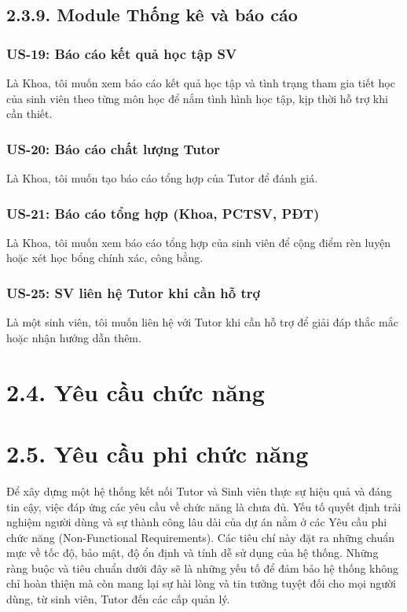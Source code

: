 
\subsection*{2.3.9. Module Thống kê và báo cáo}
\subsubsection*{US-19: Báo cáo kết quả học tập SV} 
Là Khoa, tôi muốn xem báo cáo kết quả học tập và tình trạng tham gia tiết học của sinh viên theo từng môn học để nắm tình hình học tập, kịp thời hỗ trợ khi cần thiết.

\subsubsection*{US-20: Báo cáo chất lượng Tutor} 
Là Khoa, tôi muốn tạo báo cáo tổng hợp của Tutor để đánh giá.

\subsubsection*{US-21: Báo cáo tổng hợp (Khoa, PCTSV, PĐT)} 
Là Khoa, tôi muốn xem báo cáo tổng hợp của sinh viên để cộng điểm rèn luyện hoặc xét học bổng chính xác, công bằng.

\subsubsection*{US-25: SV liên hệ Tutor khi cần hỗ trợ} 
Là một sinh viên, tôi muốn liên hệ với Tutor khi cần hỗ trợ để giải đáp thắc mắc hoặc nhận hướng dẫn thêm.

\section*{2.4. Yêu cầu chức năng}



\section*{2.5. Yêu cầu phi chức năng}
Để xây dựng một hệ thống kết nối Tutor và Sinh viên thực sự hiệu quả và đáng tin cậy, việc đáp ứng các yêu cầu về chức năng là chưa đủ. Yếu tố quyết định trải nghiệm người dùng và sự thành công lâu dài của dự án nằm ở các Yêu cầu phi chức năng (Non-Functional Requirements). Các tiêu chí này đặt ra những chuẩn mực về tốc độ, bảo mật, độ ổn định và tính dễ sử dụng của hệ thống. Những ràng buộc và tiêu chuẩn dưới đây sẽ là những yếu tố để đảm bảo hệ thống không chỉ hoàn thiện mà còn mang lại sự hài lòng và tin tưởng tuyệt đối cho mọi người dùng, từ sinh viên, Tutor đến các cấp quản lý.

